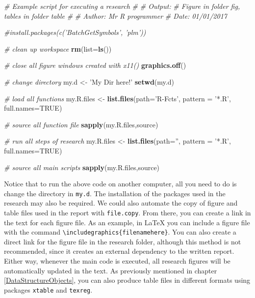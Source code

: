 \documentclass[11pt,]{book}
\newenvironment{Shaded}{\begin{snugshade}}{\end{snugshade}}
\newcommand{\KeywordTok}[1]{\textcolor[rgb]{0.27,0.27,0.27}{\textbf{#1}}}
\newcommand{\DataTypeTok}[1]{\textcolor[rgb]{0.27,0.27,0.27}{#1}}
\newcommand{\StringTok}[1]{\textcolor[rgb]{0.5,0.5,0.5}{#1}}
\newcommand{\CommentTok}[1]{\textcolor[rgb]{0.56,0.35,0.01}{\textit{#1}}}
\newcommand{\OtherTok}[1]{\textcolor[rgb]{0.56,0.35,0.01}{#1}}
\newcommand{\NormalTok}[1]{#1}
\begin{document}
\begin{Shaded}
\begin{Highlighting}[]
\CommentTok{# Example script for executing a research}
\CommentTok{#}
\CommentTok{# Output:}
\CommentTok{#   Figure in folder fig, tables in folder table}
\CommentTok{#}
\CommentTok{# Author: Mr R programmer}
\CommentTok{# Date: 01/01/2017}


\CommentTok{#install.packages(c('BatchGetSymbols', 'plm'))}

\CommentTok{# clean up workspace}
\KeywordTok{rm}\NormalTok{(}\DataTypeTok{list=}\KeywordTok{ls}\NormalTok{())}

\CommentTok{# close all figure windows created with x11()}
\KeywordTok{graphics.off}\NormalTok{()}

\CommentTok{# change directory}
\NormalTok{my.d <-}\StringTok{ 'My Dir here!'}
\KeywordTok{setwd}\NormalTok{(my.d)}

\CommentTok{# load all functions}
\NormalTok{my.R.files <-}\StringTok{ }\KeywordTok{list.files}\NormalTok{(}\DataTypeTok{path=}\StringTok{'R-Fcts'}\NormalTok{, }
                         \DataTypeTok{pattern =} \StringTok{'*.R'}\NormalTok{, }
                         \DataTypeTok{full.names=}\OtherTok{TRUE}\NormalTok{)}
                         
\CommentTok{# source all function file}
\KeywordTok{sapply}\NormalTok{(my.R.files,source)}

\CommentTok{# run all steps of research}
\NormalTok{my.R.files <-}\StringTok{ }\KeywordTok{list.files}\NormalTok{(}\DataTypeTok{path=}\StringTok{''}\NormalTok{, }
                         \DataTypeTok{pattern =} \StringTok{'*.R'}\NormalTok{, }
                         \DataTypeTok{full.names=}\OtherTok{TRUE}\NormalTok{)}
                         
\CommentTok{# source all main scripts}
\KeywordTok{sapply}\NormalTok{(my.R.files,source)}
\end{Highlighting}
\end{Shaded}

Notice that to run the above code on another computer, all you need to
do is change the directory in \texttt{my.d}. The installation of the
packages used in the research may also be required. We could also
automate the copy of figure and table files used in the report with
\texttt{file.copy}. From there, you can create a link in the text for
each figure file. As an example, in LaTeX you can include a figure file
with the command
\texttt{\textbackslash{}includegraphics\{filenamehere\}}. You can also
create a direct link for the figure file in the research folder,
although this method is not recommended, since it creates an external
dependency to the written report. Either way, whenever the main code is
executed, all research figures will be automatically updated in the
text. As previously mentioned in chapter \ref{DataStructureObjects}, you
can also produce table files in different formats using packages
\texttt{xtable} and \texttt{texreg}.
\end{document}
